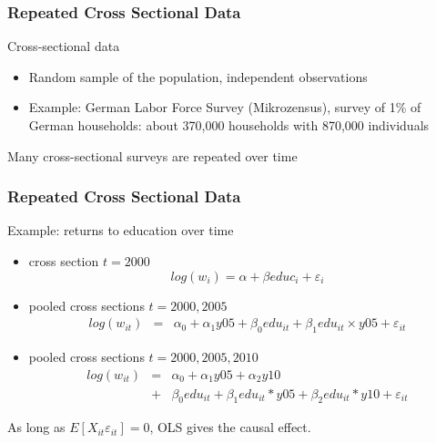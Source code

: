 \documentclass[notes=show,beamer,compress]{beamer}
\begin{document}
\begin{frame}
\frametitle{Repeated Cross Sectional Data}

Cross-sectional data
\begin {itemize}
\item Random sample of the population, independent observations
\item Example: German Labor Force Survey (Mikrozensus), survey of 1\% of German households: about 370,000 households with 870,000 individuals
\end{itemize}
Many cross-sectional surveys are repeated over time

\end{frame}

\begin{frame}
\frametitle{Repeated Cross Sectional Data}

Example: returns to education over time

\begin {itemize}
\item cross section $t=2000$
\[ log(w_i) = \alpha + \beta educ_i + \varepsilon_i \]
\item pooled cross sections $t=2000, 2005$
\begin{eqnarray*} log(w_{it}) &=& \alpha_0 +  \alpha_1 y05  + \beta_0 edu_{it} + \beta_1 edu_{it}\times{}y05 + \varepsilon_{it} 
\end{eqnarray*}
\item pooled cross sections $t=2000, 2005, 2010$
\begin{eqnarray*} log(w_{it}) &=& \alpha_0 +  \alpha_1 y05  +  \alpha_2 y10 \\
&+& \beta_0 edu_{it} + \beta_1 edu_{it} *y05 + \beta_2 edu_{it} *y10 + \varepsilon_{it} 
\end{eqnarray*}
\end{itemize}
As long as $E[X_{it}\varepsilon_{it}]=0$, OLS gives the causal effect.
\end{frame}

\end{document}

